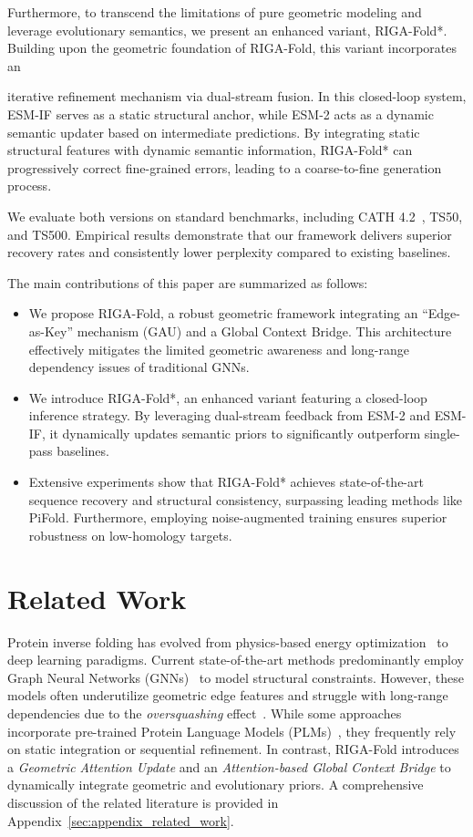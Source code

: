 \documentclass{article}
\theoremstyle{plain}
\theoremstyle{definition}
\theoremstyle{remark}
\begin{document}
Furthermore, to transcend the limitations of pure geometric modeling and leverage evolutionary semantics, we present an enhanced variant, RIGA-Fold*. Building upon the geometric foundation of RIGA-Fold, this variant incorporates an {iterative refinement mechanism via dual-stream fusion. In this closed-loop system, ESM-IF serves as a static structural anchor, while ESM-2 acts as a dynamic semantic updater based on intermediate predictions. By integrating static structural features with dynamic semantic information, RIGA-Fold* can progressively correct fine-grained errors, leading to a coarse-to-fine generation process.

We evaluate both versions on standard benchmarks, including CATH 4.2~\cite{ingraham2019generative}, TS50, and TS500. Empirical results demonstrate that our framework delivers superior recovery rates and consistently lower perplexity compared to existing baselines.

The main contributions of this paper are summarized as follows:
\begin{itemize}
    \item We propose RIGA-Fold, a robust geometric framework integrating an ``Edge-as-Key'' mechanism (GAU) and a Global Context Bridge. This architecture effectively mitigates the limited geometric awareness and long-range dependency issues of traditional GNNs.
    \item We introduce RIGA-Fold*, an enhanced variant featuring a closed-loop inference strategy. By leveraging dual-stream feedback from ESM-2 and ESM-IF, it dynamically updates semantic priors to significantly outperform single-pass baselines.
    \item Extensive experiments show that RIGA-Fold* achieves state-of-the-art sequence recovery and structural consistency, surpassing leading methods like PiFold. Furthermore, employing noise-augmented training ensures superior robustness on low-homology targets.
\end{itemize}

\section{Related Work}\label{sec:related_work}
Protein inverse folding has evolved from physics-based energy optimization~\cite{leaver2011rosetta3} to deep learning paradigms. Current state-of-the-art methods predominantly employ Graph Neural Networks (GNNs)~\cite{ingraham2019generative, jing2020learning, dauparas2022robust, gao2022pifold} to model structural constraints. However, these models often underutilize geometric edge features and struggle with long-range dependencies due to the \textit{oversquashing} effect~\cite{alon2020bottleneck}. While some approaches incorporate pre-trained Protein Language Models (PLMs)~\cite{hsu2022learning, zheng2023structure}, they frequently rely on static integration or sequential refinement. In contrast, RIGA-Fold introduces a \textit{Geometric Attention Update} and an \textit{Attention-based Global Context Bridge} to dynamically integrate geometric and evolutionary priors. A comprehensive discussion of the related literature is provided in Appendix~\ref{sec:appendix_related_work}.

}
\end{document}
